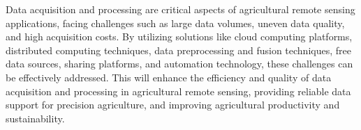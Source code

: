 Data acquisition and processing are critical aspects of agricultural remote sensing applications, facing challenges such as large data volumes, uneven data quality, and high acquisition costs. By utilizing solutions like cloud computing platforms, distributed computing techniques, data preprocessing and fusion techniques, free data sources, sharing platforms, and automation technology, these challenges can be effectively addressed. This will enhance the efficiency and quality of data acquisition and processing in agricultural remote sensing, providing reliable data support for precision agriculture, and improving agricultural productivity and sustainability.

